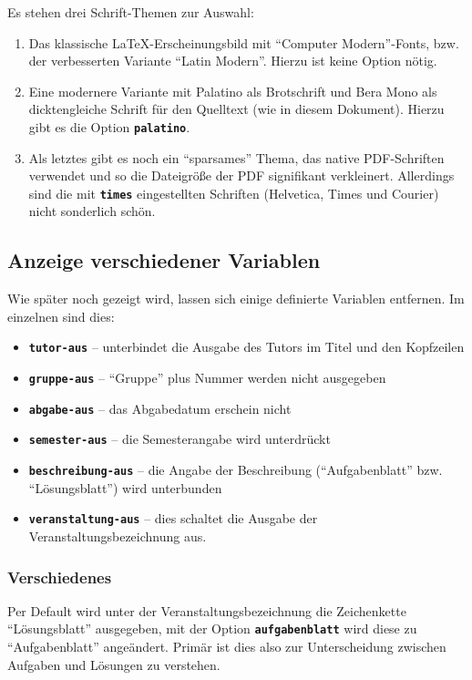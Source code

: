 \documentclass[palatino,gruppe-aus,semester-aus,veranstaltung-aus,abgabe-aus,tutor-aus,utf]{../cls/uhb-inf}
\def\option#1{\texttt{\bfseries #1}}
\begin{document}
Es stehen drei Schrift-Themen zur Auswahl:

\begin{enumerate}
	\item Das klassische \LaTeX-Erscheinungsbild mit "`Computer Modern"'-Fonts, bzw. der verbesserten Variante "`Latin Modern"'. Hierzu ist keine Option nötig.
	\item Eine modernere Variante mit Palatino als Brotschrift und Bera Mono als dicktengleiche Schrift für den Quelltext (wie in diesem Dokument). Hierzu gibt es die Option \option{palatino}.
	\item Als letztes gibt es noch ein "`sparsames"' Thema, das native PDF-Schriften verwendet und so die Dateigröße der PDF signifikant verkleinert. Allerdings sind die mit \option{times} eingestellten Schriften (Helvetica, Times und Courier) nicht sonderlich schön.
\end{enumerate}

\subsection{Anzeige verschiedener Variablen}

Wie später noch gezeigt wird, lassen sich einige definierte Variablen entfernen. Im einzelnen sind dies:

\begin{itemize}
	\item \option{tutor-aus} -- unterbindet die Ausgabe des Tutors im Titel und den Kopfzeilen
	\item \option{gruppe-aus} -- "`Gruppe"' plus Nummer werden nicht ausgegeben
	\item \option{abgabe-aus} -- das Abgabedatum erschein nicht
	\item \option{semester-aus} -- die Semesterangabe wird unterdrückt
	\item \option{beschreibung-aus} -- die Angabe der Beschreibung ("`Aufgabenblatt"' bzw. "`Lösungsblatt"') wird unterbunden
	\item \option{veranstaltung-aus} -- dies schaltet die Ausgabe der Veranstaltungsbezeichnung aus.
\end{itemize}

\subsubsection{Verschiedenes}

Per Default wird unter der Veranstaltungsbezeichnung die Zeichenkette "`Lösungsblatt"' ausgegeben, mit der Option \option{aufgabenblatt} wird diese zu "`Aufgabenblatt"' angeändert. Primär ist dies also zur Unterscheidung zwischen Aufgaben und Lösungen zu verstehen.
\end{document}
